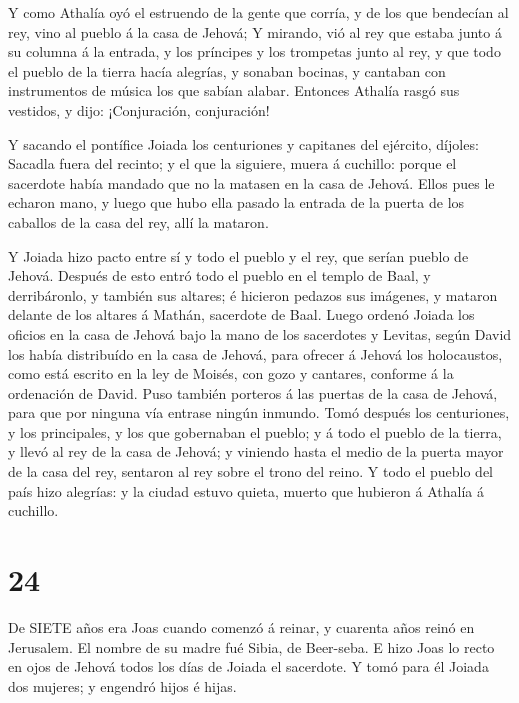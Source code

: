  Y como Athalía oyó el estruendo de la gente que corría, y
de los que bendecían al rey, vino al pueblo á la casa de Jehová;
 Y mirando, vió al rey que estaba junto á su columna á la
entrada, y los príncipes y los trompetas junto al rey, y que todo el
pueblo de la tierra hacía alegrías, y sonaban bocinas, y cantaban con
instrumentos de música los que sabían alabar. Entonces Athalía rasgó sus
vestidos, y dijo: ¡Conjuración, conjuración!

 Y sacando el pontífice Joiada los centuriones y capitanes
del ejército, díjoles: Sacadla fuera del recinto; y el que la siguiere,
muera á cuchillo: porque el sacerdote había mandado que no la matasen en
la casa de Jehová.  Ellos pues le echaron mano, y luego que
hubo ella pasado la entrada de la puerta de los caballos de la casa del
rey, allí la mataron.

 Y Joiada hizo pacto entre sí y todo el pueblo y el rey,
que serían pueblo de Jehová.  Después de esto entró todo el
pueblo en el templo de Baal, y derribáronlo, y también sus altares; é
hicieron pedazos sus imágenes, y mataron delante de los altares á
Mathán, sacerdote de Baal.  Luego ordenó Joiada los oficios
en la casa de Jehová bajo la mano de los sacerdotes y Levitas, según
David los había distribuído en la casa de Jehová, para ofrecer á Jehová
los holocaustos, como está escrito en la ley de Moisés, con gozo y
cantares, conforme á la ordenación de David.  Puso también
porteros á las puertas de la casa de Jehová, para que por ninguna vía
entrase ningún inmundo.  Tomó después los centuriones, y
los principales, y los que gobernaban el pueblo; y á todo el pueblo de
la tierra, y llevó al rey de la casa de Jehová; y viniendo hasta el
medio de la puerta mayor de la casa del rey, sentaron al rey sobre el
trono del reino.  Y todo el pueblo del país hizo alegrías:
y la ciudad estuvo quieta, muerto que hubieron á Athalía á cuchillo.

\hypertarget{section-23}{%
\section{24}\label{section-23}}

 De SIETE años era Joas cuando comenzó á reinar, y cuarenta
años reinó en Jerusalem. El nombre de su madre fué Sibia, de Beer-seba.
 E hizo Joas lo recto en ojos de Jehová todos los días de
Joiada el sacerdote.  Y tomó para él Joiada dos mujeres; y
engendró hijos é hijas.

